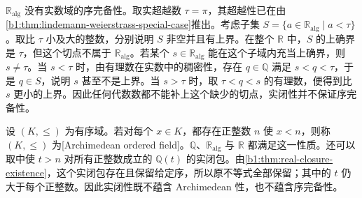 \(\mathbb R_{\mathrm{alg}}\) 没有实数域的序完备性。取实超越数 \(\tau=\pi\)，其超越性已在由\cref{b1:thm:lindemann-weierstrass-special-case}推出。考虑子集 \(S=\{a\in\mathbb R_{\mathrm{alg}}\mid a<\tau\}\)。取比 \(\tau\) 小及大的整数，分别说明 \(S\) 非空并且有上界。在整个 \(\mathbb R\) 中，\(S\) 的上确界是 \(\tau\)，但这个切点不属于 \(\mathbb R_{\mathrm{alg}}\)。若某个 \(s\in\mathbb R_{\mathrm{alg}}\) 能在这个子域内充当上确界，则 \(s\neq\tau\)。当 \(s<\tau\) 时，由有理数在实数中的稠密性，存在 \(q\in\mathbb Q\) 满足 \(s<q<\tau\)，于是 \(q\in S\)，说明 \(s\) 甚至不是上界。当 \(s>\tau\) 时，取 \(\tau<q<s\) 的有理数，便得到比 \(s\) 更小的上界。因此任何代数数都不能补上这个缺少的切点，实闭性并不保证序完备性。

\ProseParagraphBreak
设 \((K,\leq)\) 为有序域。若对每个 \(x\in K\)，都存在正整数 \(n\) 使 \(x<n\)，则称 \((K,\leq)\) 为[Archimedean ordered field]。\(\mathbb Q\)、\(\mathbb R_{\mathrm{alg}}\) 与 \(\mathbb R\) 都满足这一性质。还可以取中使 \(t>n\) 对所有正整数成立的 \(\mathbb Q(t)\) 的实闭包。由\cref{b1:thm:real-closure-existence}，这个实闭包存在且保留给定序，所以原不等式全部保留；其中的 \(t\) 仍大于每个正整数。因此实闭性既不蕴含 Archimedean 性，也不蕴含序完备性。
